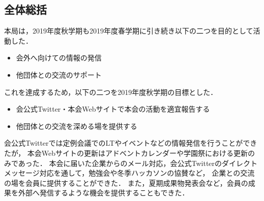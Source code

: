 \subsection*{全体総括}


本局は，2019年度秋学期も2019年度春学期に引き続き以下の二つを目的として活動した．
\begin{itemize}
	\item 会外へ向けての情報の発信
	\item 他団体との交流のサポート
\end{itemize}
これを達成するため，以下の二つを2019年度秋学期の目標とした．
\begin{itemize}
	\item 会公式Twitter・本会Webサイトで本会の活動を適宜報告する
	\item 他団体との交流を深める場を提供する
\end{itemize}

会公式Twitterでは定例会議でのLTやイベントなどの情報発信を行うことができたが，
本会Webサイトの更新はアドベントカレンダーや学園祭における更新のみであった．
本会に届いた企業からのメール対応，会公式Twitterのダイレクトメッセージ対応を通して，勉強会や冬季ハッカソンの協賛など，
企業との交流の場を会員に提供することができた．
また，夏期成果物発表会など，会員の成果を外部へ発信するような機会を提供することもできた．
